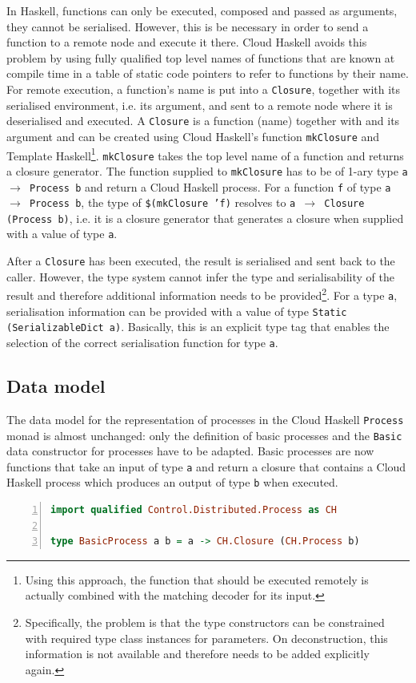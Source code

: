 In \textsf{Haskell}, functions can only be executed, composed and passed as arguments, they cannot be serialised. However, this is be necessary in order to send a function to a remote node and execute it there. \textsf{Cloud Haskell} avoids this problem by using fully qualified top level names of functions that are known at compile time in a table of static code pointers to refer to functions by their name. For remote execution, a function's name is put into a \texttt{Closure}, together with its serialised environment, i.e. its argument, and sent to a remote node where it is deserialised and executed. A \texttt{Closure} is a function (name) together with and its argument \cite{Epstein:2011:THC:2034675.2034690} and can be created using \textsf{Cloud Haskell}'s function \texttt{mkClosure} and \textsf{Template Haskell}\footnote{Using this approach, the function that should be executed remotely is actually combined with the matching decoder for its input.}. \texttt{mkClosure} takes the top level name of a function and returns a closure generator. The function supplied to \texttt{mkClosure} has to be of 1-ary type \texttt{a $\to$ Process b} and return a \textsf{Cloud Haskell} process. For a function \texttt{f} of type \texttt{a $\to$ Process b}, the type of \texttt{\$(mkClosure 'f)} resolves to \texttt{a $\to$ Closure (Process b)}, i.e. it is a closure generator that generates a closure when supplied with a value of type \texttt{a}.

After a \texttt{Closure} has been executed, the result is serialised and sent back to the caller. However, the type system cannot infer the type and serialisability of the result and therefore additional information needs to be provided\footnote{Specifically, the problem is that the type constructors can be constrained with required type class instances for parameters. On deconstruction, this information is not available and therefore needs to be added explicitly again.}. For a type \texttt{a}, serialisation information can be provided with a value of type \texttt{Static (SerializableDict a)}. Basically, this is an explicit type tag that enables the selection of the correct serialisation function for type \texttt{a}.

\subsection{Data model}
\label{chp:distributed_model}
The data model for the representation of processes in the \textsf{Cloud Haskell} \texttt{Process} monad is almost unchanged: only the definition of basic processes and the \texttt{Basic} data constructor for processes have to be adapted. Basic processes are now functions that take an input of type \texttt{a} and return a closure that contains a \textsf{Cloud Haskell} process which produces an output of type \texttt{b} when executed.
\begin{lstlisting}[language=Haskell,caption=Representation of basic processes as computations in the \texttt{Process} monad.,numbers=left,frame=bt]
import qualified Control.Distributed.Process as CH

type BasicProcess a b = a -> CH.Closure (CH.Process b)
\end{lstlisting}

